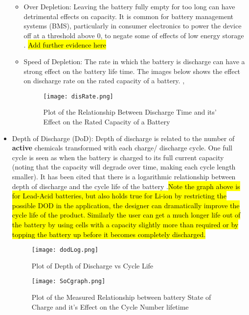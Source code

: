 \begin{itemize}
  \begin{itemize}
  \tightlist
  \item
    Over Depletion: Leaving the battery fully empty for too long can
    have detrimental effects on capacity. It is common for battery
    management systems (BMS), particularly in consumer electronics to
    power the device off at a threshold above 0, to negate some of
    effects of low energy storage \cite{Prematur82:online}.
    \hl{Add further evidence here}
  \item
    Speed of Depletion: The rate in which the battery is discharge can
    have a strong effect on the battery life time. The images below
    shows the effect on discharge rate on the rated capacity of a
    battery. \cite{BatteryL10:online},\cite{Effectso69:online}

    \begin{figure}[H]
       \centering
       \texttt{[image: disRate.png]}
       \caption{Plot of the Relationship Between Discharge Time and its' Effect on the Rated Capacity of a Battery \cite{Effectso69:online}}
       \label{disRate}
     \end{figure}
  \end{itemize}
\item
  Depth of Discharge (DoD): Depth of discharge is related to the number
  of \textbf{active} chemicals transformed with each charge/ discharge
  cycle. One full cycle is seen as when the battery is charged to its
  full current capacity (noting that the capacity will degrade over
  time, making each cycle length smaller). It has been cited that there
  is a logarithmic relationship between depth of discharge and the cycle
  life of the battery
  \cite{BatteryL10:online}.\hl{Note the graph above is for Lead-Acid batteries, but also holds true for Li-ion by restricting the possible DOD in the application, the designer can dramatically improve the cycle life of the product. Similarly the user can get a much longer life out of the battery by using cells with a capacity slightly more than required or by topping the battery up before it becomes completely discharged.}
  \cite{BatteryL10:online}

  \begin{figure}[H]
    \centering
    \texttt{[image: dodLog.png]}
    \caption{Plot of Depth of Discharge vs Cycle Life \cite{BatteryL10:online}}
    \label{dodLog}
  \end{figure}

  \begin{figure}[H]
  \centering
  \texttt{[image: SoCgraph.png]}
  \caption{Plot of the Measured  Relationship between battery State of Charge and it's Effect on the Cycle Number lifetime \cite{xu2016modeling}}
  \label{SoCgraph}
    \end{figure}
\end{itemize}

